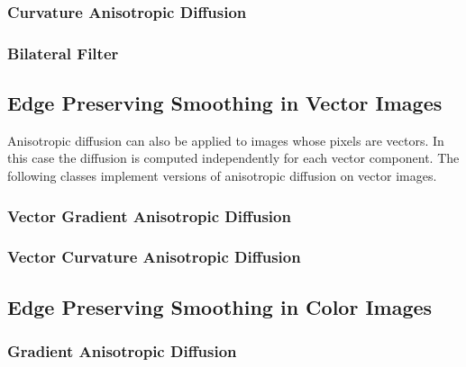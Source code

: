 \subsubsection{Curvature Anisotropic Diffusion}
\label{sec:CurvatureAnisotropicDiffusionImageFilter}

%


\subsubsection{Bilateral Filter}
\label{sec:BilateralImageFilter}

%



\subsection{Edge Preserving Smoothing in Vector Images}
\label{sec:VectorAnisotropicDiffusion}

Anisotropic diffusion can also be applied to images whose pixels are vectors.
In this case the diffusion is computed independently for each vector component.
The following classes implement versions of anisotropic diffusion on vector images.


\subsubsection{Vector Gradient Anisotropic Diffusion}
\label{sec:VectorGradientAnisotropicDiffusionImageFilter}

%

\subsubsection{Vector Curvature Anisotropic Diffusion}
\label{sec:VectorCurvatureAnisotropicDiffusionImageFilter}

%



\subsection{Edge Preserving Smoothing in Color Images}
\label{sec:ColorAnisotropicDiffusion}

\subsubsection{Gradient Anisotropic Diffusion}
\label{sec:ColorGradientAnisotropicDiffusion}

